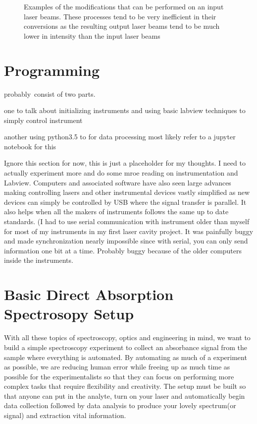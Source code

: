 \documentclass[11pt,a4paper]{book}
\newcommand{\imginput}[1]{} %
\begin{document}
		\begin{figure} [!ht]
			\centering
			\def\svgwidth{\columnwidth}
			\resizebox{16cm}{!}{\imginput{images/non-linear-crystals.pdf_tex}}
			\caption{Examples of the modifications that can be performed on an input laser beams. These processes tend to be very inefficient in their conversions as the resulting output laser beams tend to be much lower in intensity than the input laser beams}
			\label{fig:non-linear-crystals}
		\end{figure}
		
	\section{Programming}
		\label{sec:Programming}
		probably\ consist of two parts.
		
		one to talk about initializing instruments and using basic labview techniques to simply control instrument 
		
		another using python3.5 to for data processing
		most likely refer to a jupyter notebook for this
		
		Ignore this section for now, this is just a placeholder for my thoughts. I need to actually experiment more and do some mroe reading on instrumentation and Labview. Computers and associated software have also seen large advances making controlling lasers and other instrumental devices vastly simplified as new devices can simply be controlled by USB where the signal transfer is parallel. It also helps when all the makers of instruments follows the same up to date standards. (I had to use serial communication with instrument older than myself for most of my instruments in my first laser cavity project. It was painfully buggy and made synchronization nearly impossible since with serial, you can only send information one bit at a time. Probably buggy because of the older computers inside the instruments.

	\section{Basic Direct Absorption Spectrosopy Setup}
		\label{sec:Basic Direct Absorption Spectrosopy Setup}
		With all these topics of spectroscopy, optics and engineering in mind, we want to build a simple spectroscopy experiment to collect an absorbance signal from the sample where everything is automated. By automating as much of a experiment as possible, we are reducing human error while freeing up as much time as possible for the experimentalists so that they  can focus on performing more complex tasks that require flexibility and creativity. The setup must be built so that anyone can put in the analyte, turn on your laser and automatically begin data collection followed by data analysis to produce your lovely spectrum(or signal) and extraction vital information.
		
\end{document}
